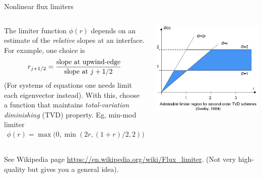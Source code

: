 \documentclass[aspectratio=169]{beamer}
\begin{document}
\begin{frame}{Nonlinear flux limiters}
  \small
  \begin{columns}
    \begin{column}{0.5\linewidth}
      The limiter function $\phi(r)$ depends on an estimate of the
      \emph{relative} slopes at an interface. For example, one choice
      is
      \begin{align*}
        r_{j+1/2} = \frac{\textrm{\textrm{slope at upwind-edge}}}{\textrm{slope at } j+1/2}
      \end{align*}
      (For systems of equations one needs limit each eigenvector
      instead). With this, choose a function that maintains
      \emph{total-variation diminishing} (TVD) property. Eg, min-mod
      limiter
      \begin{align*}
        \phi(r) = \max\big(0, \min(2r, (1+r)/2,2) \big).
      \end{align*}
    \end{column}
    
    \begin{column}{0.5\linewidth}
      \includegraphics[width=\linewidth]{LimiterRegion.png}
    \end{column}
  \end{columns}
  See Wikipedia page
  \url{https://en.wikipedia.org/wiki/Flux_limiter}. (Not very
  high-quality but gives you a general idea).
\end{frame}
\end{document}
